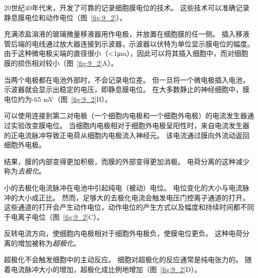 \begin{proposition}[记录膜电位] \label{box:9_1}
	
	\quad \quad 20世纪40年代末，开发了可靠的记录细胞膜电位的技术。
	这些技术可以准确记录静息膜电位和动作电位（图~\ref{fig:9_2}）。
	
	\quad \quad 充满浓盐溶液的玻璃微量移液器用作电极，并放置在细胞膜的任一侧。
	插入移液管后端的电线通过放大器连接到示波器，示波器以伏特为单位显示膜电位的幅度。
	由于这种微电极尖端的直径很小（<1μm），因此可以将其插入细胞中，而对细胞膜的损伤相对较小（图~\ref{fig:9_2}A）。
	
	\quad \quad 当两个电极都在电池外部时，不会记录电位差。
	但一旦将一个微电极插入电池，示波器就会显示出稳定的电压，即静息膜电位。
	在大多数静止的神经细胞中，膜电位约为-65 mV（图~\ref{fig:9_2}B）。
	
	\quad \quad 可以使用连接到第二对电极（一个细胞内电极和一个细胞外电极）的电流发生器通过实验改变膜电位。
	当细胞内电极相对于细胞外电极呈阳性时，来自电流发生器的正电流脉冲导致正电荷从细胞内电极流入神经元。
	该电流通过膜向外流动返回细胞外电极。
	
	\quad \quad 结果，膜的内部变得更加积极，而膜的外部变得更加消极。
	电荷分离的这种减少称为\textit{去极化}。
	
	\quad \quad 小的去极化电流脉冲在电池中引起纯电（被动）电位。
	电位变化的大小与电流脉冲的大小成正比。
	然而，足够大的去极化电流会触发电压门控离子通道的打开。
	这些通道的打开会产生动作电位，动作电位的产生方式以及幅度和持续时间都不同于电离子电位（图~\ref{fig:9_2}C）。
	
	\quad \quad 反转电流方向，使细胞内电极相对于细胞外电极负，使膜电位更负。
	这种电荷分离的增加被称为\textit{超极化}。
	
	\quad \quad 超极化不会触发细胞中的主动反应。
	细胞对超极化的反应通常是纯电张力的。
	随着电流脉冲大小的增加，超极化成比例地增加（图~\ref{fig:9_2}D）。
	
\end{proposition}


